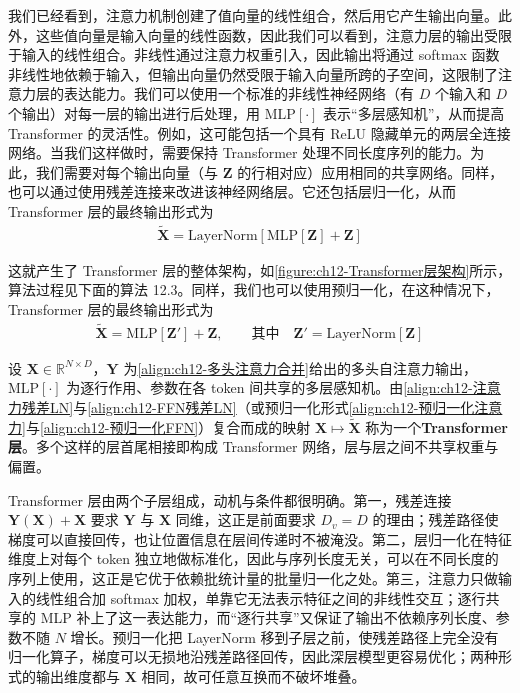 \documentclass[../../main.tex]{subfiles}
\begin{document}
我们已经看到，注意力机制创建了值向量的线性组合，然后用它产生输出向量。此外，这些值向量是输入向量的线性函数，因此我们可以看到，注意力层的输出受限于输入的线性组合。非线性通过注意力权重引入，因此输出将通过 softmax 函数非线性地依赖于输入，但输出向量仍然受限于输入向量所跨的子空间，这限制了注意力层的表达能力。我们可以使用一个标准的非线性神经网络（有 $D$ 个输入和 $D$ 个输出）对每一层的输出进行后处理，用 $\mathrm{MLP}[\cdot]$ 表示“多层感知机”，从而提高 Transformer 的灵活性。例如，这可能包括一个具有 ReLU 隐藏单元的两层全连接网络。当我们这样做时，需要保持 Transformer 处理不同长度序列的能力。为此，我们需要对每个输出向量（与 $\mathbf{Z}$ 的行相对应）应用相同的共享网络。同样，也可以通过使用残差连接来改进该神经网络层。它还包括层归一化，从而 Transformer 层的最终输出形式为
\begin{align}
\tilde{\mathbf{X}}=\mathrm{LayerNorm}\left[\mathrm{MLP}[\mathbf{Z}]+\mathbf{Z}\right]
\label{align:ch12-FFN残差LN}
\end{align}

这就产生了 Transformer 层的整体架构，如\cref{figure:ch12-Transformer层架构}所示，算法过程见下面的算法 12.3。同样，我们也可以使用预归一化，在这种情况下，Transformer 层的最终输出形式为
\begin{align}
\tilde{\mathbf{X}}=\mathrm{MLP}[\mathbf{Z}']+\mathbf{Z},\qquad \text{其中}\quad \mathbf{Z}'=\mathrm{LayerNorm}\left[\mathbf{Z}\right]
\label{align:ch12-预归一化FFN}
\end{align}

\begin{definition}[Transformer 层]\label{definition:ch12-Transformer层}
设 $\mathbf{X}\in\mathbb{R}^{N\times D}$，$\mathbf{Y}$ 为\eqref{align:ch12-多头注意力合并}给出的多头自注意力输出，$\mathrm{MLP}[\cdot]$ 为逐行作用、参数在各 token 间共享的多层感知机。由\eqref{align:ch12-注意力残差LN}与\eqref{align:ch12-FFN残差LN}（或预归一化形式\eqref{align:ch12-预归一化注意力}与\eqref{align:ch12-预归一化FFN}）复合而成的映射 $\mathbf{X}\mapsto\tilde{\mathbf{X}}$ 称为一个\textbf{Transformer 层}。多个这样的层首尾相接即构成 Transformer 网络，层与层之间不共享权重与偏置。
\end{definition}

\begin{remark}
Transformer 层由两个子层组成，动机与条件都很明确。第一，残差连接 $\mathbf{Y}(\mathbf{X})+\mathbf{X}$ 要求 $\mathbf{Y}$ 与 $\mathbf{X}$ 同维，这正是前面要求 $D_v=D$ 的理由；残差路径使梯度可以直接回传，也让位置信息在层间传递时不被淹没。第二，层归一化在特征维度上对每个 token 独立地做标准化，因此与序列长度无关，可以在不同长度的序列上使用，这正是它优于依赖批统计量的批量归一化之处。第三，注意力只做输入的线性组合加 softmax 加权，单靠它无法表示特征之间的非线性交互；逐行共享的 MLP 补上了这一表达能力，而“逐行共享”又保证了输出不依赖序列长度、参数不随 $N$ 增长。预归一化把 LayerNorm 移到子层之前，使残差路径上完全没有归一化算子，梯度可以无损地沿残差路径回传，因此深层模型更容易优化；两种形式的输出维度都与 $\mathbf{X}$ 相同，故可任意互换而不破坏堆叠。
\end{remark}
\end{document}
